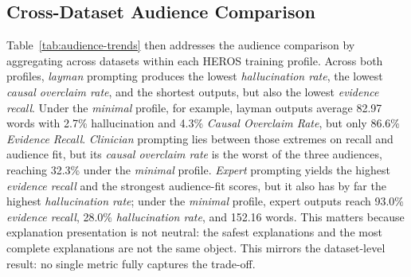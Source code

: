 \documentclass[sigconf]{acmart}
\begin{document}
\subsection{Cross-Dataset Audience Comparison}
Table~\ref{tab:audience-trends} then addresses the audience comparison by aggregating across datasets within each HEROS training profile. Across both profiles, \emph{layman} prompting produces the lowest \emph{hallucination rate}, the lowest \emph{causal overclaim rate}, and the shortest outputs, but also the lowest \emph{evidence recall}. Under the \emph{minimal} profile, for example, layman outputs average 82.97 words with 2.7\% hallucination and 4.3\% \emph{Causal Overclaim Rate}, but only 86.6\% \emph{Evidence Recall}. \emph{Clinician} prompting lies between those extremes on recall and audience fit, but its \emph{causal overclaim rate} is the worst of the three audiences, reaching 32.3\% under the \emph{minimal} profile. \emph{Expert} prompting yields the highest \emph{evidence recall} and the strongest audience-fit scores, but it also has by far the highest \emph{hallucination rate}; under the \emph{minimal} profile, expert outputs reach 93.0\% \emph{evidence recall}, 28.0\% \emph{hallucination rate}, and 152.16 words. This matters because explanation presentation is not neutral: the safest explanations and the most complete explanations are not the same object. This mirrors the dataset-level result: no single metric fully captures the trade-off.

\end{document}
